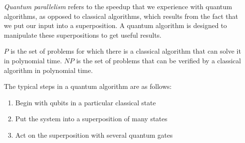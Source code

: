 
\begin{definition}
    \emph{Quantum parallelism} refers to the speedup that we experience with quantum algorithms, as opposed to classical algorithms, which results from the fact that we put our input into a superposition. A quantum algorithm is designed to manipulate these superpositions to get useful results.
\end{definition}

\begin{definition}
    $P$ is the set of problems for which there is a classical algorithm that can solve it in polynomial time.
    $NP$ is the set of problems that can be verified by a classical algorithm in polynomial time.
\end{definition}

The typical steps in a quantum algorithm are as follows:
\begin{enumerate}
    \item Begin with qubits in a particular classical state
    \item Put the system into a superposition of many states
    \item Act on the superposition with several quantum gates
\end{enumerate}

